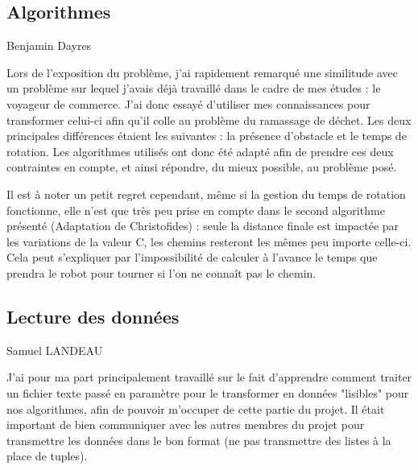 \documentclass{article}
\begin{document}
\subsection{Algorithmes}
Benjamin Dayres

Lors de l'exposition du problème, j'ai rapidement remarqué une similitude avec un problème sur lequel j'avais déjà travaillé dans le cadre de mes études : le voyageur de commerce.
J'ai donc essayé d'utiliser mes connaissances pour transformer celui-ci afin qu'il colle au problème du ramassage de déchet. Les deux principales différences étaient les suivantes : la présence d'obstacle et le temps de rotation.
Les algorithmes utilisés ont donc été adapté afin de prendre ces deux contraintes en compte, et ainsi répondre, du mieux possible, au problème posé. \newline

Il est à noter un petit regret cependant, même si la gestion du temps de rotation fonctionne, elle n'est que très peu prise en compte dans le second algorithme présenté (Adaptation de Christofides) : seule la distance finale est impactée par les variations de la valeur C, les chemins resteront les mêmes peu importe celle-ci. Cela peut s'expliquer par l'impossibilité de calculer à l'avance le temps que prendra le robot pour tourner si l'on ne connaît pas le chemin.

\subsection{Lecture des données}
Samuel LANDEAU

J'ai pour ma part principalement travaillé sur le fait d'apprendre comment traiter un fichier texte passé en paramètre pour le transformer en données
"lisibles" pour nos algorithmes, afin de pouvoir m'occuper de cette partie du projet. Il était important de bien communiquer avec les autres membres du 
projet pour transmettre les données dans le bon format (ne pas transmettre des listes à la place de tuples).
\end{document}
